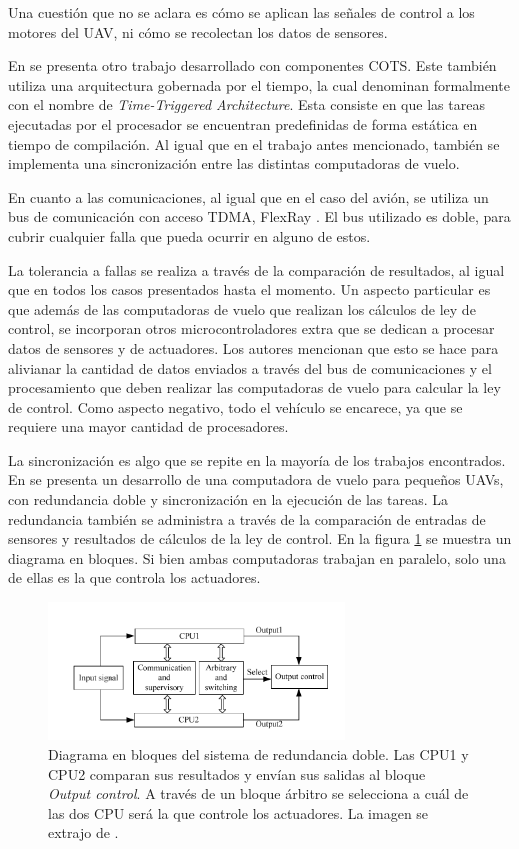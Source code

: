 Una cuestión que no se aclara es cómo se aplican las señales de control a los motores del UAV, ni cómo se recolectan los datos de sensores.

En \cite{zhang2020architecture} se presenta otro trabajo desarrollado con componentes COTS. Este también utiliza una arquitectura gobernada por el tiempo, la cual denominan formalmente con el nombre de \textit{Time-Triggered Architecture}. Esta consiste en que las tareas ejecutadas por el procesador se encuentran predefinidas de forma estática en tiempo de compilación. Al igual que en el trabajo antes mencionado, también se implementa una sincronización entre las distintas computadoras de vuelo.

En cuanto a las comunicaciones, al igual que en el caso del avión, se utiliza un bus de comunicación con acceso TDMA, FlexRay \cite{nxpAN12233}. El bus utilizado es doble, para cubrir cualquier falla que pueda ocurrir en alguno de estos. 

La tolerancia a fallas se realiza a través de la comparación de resultados, al igual que en todos los casos presentados hasta el momento. Un aspecto particular es que además de las computadoras de vuelo que realizan los cálculos de ley de control, se incorporan otros microcontroladores extra que se dedican a procesar datos de sensores y de actuadores. Los autores mencionan que esto se hace para alivianar la cantidad de datos enviados a través del bus de comunicaciones y el procesamiento que deben realizar las computadoras de vuelo para calcular la ley de control. Como aspecto negativo, todo el vehículo se encarece, ya que se requiere una mayor cantidad de procesadores.

La sincronización es algo que se repite en la mayoría de los trabajos encontrados. En \cite{zhang2015dual} se presenta un desarrollo de una computadora de vuelo para pequeños UAVs, con redundancia doble y sincronización en la ejecución de las tareas. La redundancia también se administra a través de la comparación de entradas de sensores y resultados de cálculos de la ley de control. En la figura \ref{fig:FCC_dual_FPGA} se muestra un diagrama en bloques. Si bien ambas computadoras trabajan en paralelo, solo una de ellas es la que controla los actuadores. 

\begin{figure}[H]
    \centering
    \includegraphics[width=0.7\textwidth]{img/FCC_dual_FPGA.png}
    \caption{Diagrama en bloques del sistema de redundancia doble. Las CPU1 y CPU2 comparan sus resultados y envían sus salidas al bloque \textit{Output control}. A través de un bloque árbitro se selecciona a cuál de las dos CPU será la que controle los actuadores. La imagen se extrajo de \cite{zhang2015dual}.}
    \label{fig:FCC_dual_FPGA}
\end{figure}

